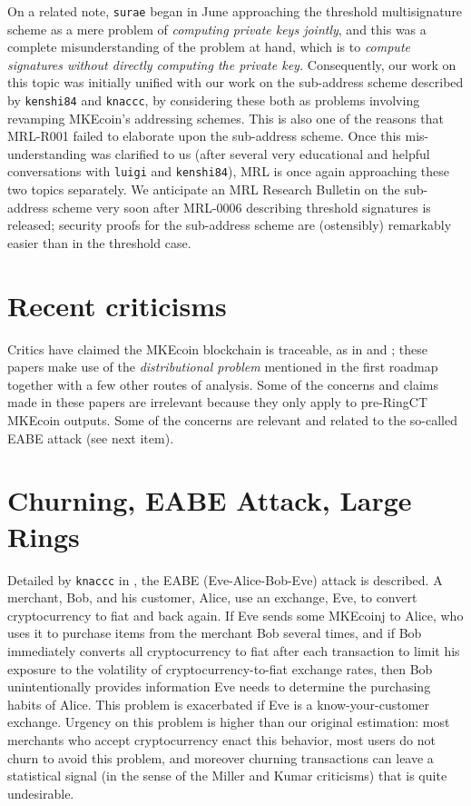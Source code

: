 \documentclass[12pt,english]{mrl}
\theoremstyle{definition}
\numberwithin{equation}{section}
\numberwithin{figure}{section}
\numberwithin{equation}{section}
\numberwithin{equation}{section}
\numberwithin{figure}{section}
\begin{document}
    
On a related note, \texttt{surae} began in June approaching the threshold multisignature scheme as a mere problem of \textit{computing private keys jointly}, and this was a complete misunderstanding of the problem at hand, which is to \textit{compute signatures without directly computing the private key.} Consequently, our work on this topic was initially unified with our work on the sub-address scheme described by \texttt{kenshi84} and \texttt{knaccc}, by considering these both as problems involving revamping MKEcoin's addressing schemes. This is also one of the reasons that MRL-R001 failed to elaborate upon the sub-address scheme. Once this mis-understanding was clarified to us (after several very educational and helpful conversations with \texttt{luigi} and \texttt{kenshi84}), MRL is once again approaching these two topics separately. We anticipate an MRL Research Bulletin on the sub-address scheme very soon after MRL-0006 describing threshold signatures is released; security proofs for the sub-address scheme are (ostensibly) remarkably easier than in the threshold case.
    
\section{Recent criticisms} 

Critics have claimed the MKEcoin blockchain is traceable, as in \cite{miller2017empirical} and \cite{kumar2017traceability}; these papers make use of the \emph{distributional problem} mentioned in the first roadmap together with a few other routes of analysis. Some of the concerns and claims made in these papers are irrelevant because they only apply to pre-RingCT MKEcoin outputs. Some of the concerns are relevant and related to the so-called EABE attack (see next item).
    
    
    
\section{Churning, EABE Attack, Large Rings}

Detailed by \texttt{knaccc} in \cite{knaccc2017}, the EABE (Eve-Alice-Bob-Eve) attack is described. A merchant, Bob, and his customer, Alice, use an exchange, Eve, to convert cryptocurrency to fiat and back again. If Eve sends some MKEcoinj to Alice, who uses it to purchase items from the merchant Bob several times, and if Bob immediately converts all cryptocurrency to fiat after each transaction to limit his exposure to the volatility of cryptocurrency-to-fiat exchange rates, then Bob unintentionally provides information Eve needs to determine the purchasing habits of Alice. This problem is exacerbated if Eve is a know-your-customer exchange. Urgency on this problem is higher than our original estimation: most merchants who accept cryptocurrency enact this behavior, most users do not churn to avoid this problem, and moreover churning transactions can leave a statistical signal (in the sense of the Miller and Kumar criticisms) that is quite undesirable.  
    
\end{document}
